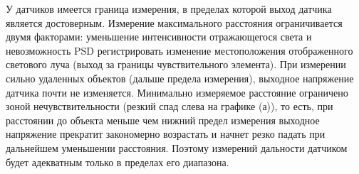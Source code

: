 \documentclass[12pt]{article}
\begin{document}
У датчиков имеется граница измерения, в пределах которой выход датчика является достоверным. Измерение максимального расстояния ограничивается двумя факторами: уменьшение интенсивности отражающегося света и невозможность PSD регистрировать изменение местоположения отображенного светового луча (выход за границы чувствительного элемента). При измерении сильно удаленных объектов (дальше предела измерения), выходное напряжение датчика почти не изменяется. Минимально измеряемое расстояние ограничено зоной нечувствительности (резкий спад слева на графике (а)), то есть, при расстоянии до объекта меньше чем нижний предел измерения выходное напряжение прекратит закономерно возрастать и начнет резко падать при дальнейшем уменьшении расстояния. Поэтому измерений дальности датчиком будет адекватным только в пределах его диапазона.
\end{document}
